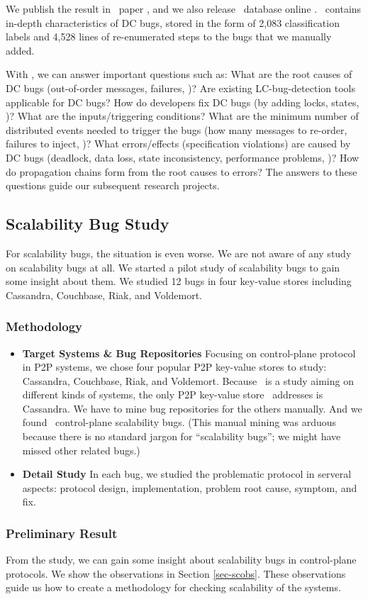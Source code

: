 We publish the result in \taxdc\ paper \cite{Leesatapornwongsa+16-TaxDC}, and we
also release \taxdc\ database online \cite{TaxDCWeb}.  \taxdc\ contains in-depth
characteristics of DC bugs, stored in the form of 2,083 classification labels
and 4,528 lines of re-enumerated steps to the bugs that we manually added. 

With \taxdc, we can answer important questions such as: What are the root causes
of DC bugs (out-of-order messages, failures, \etc)?  Are existing
LC-bug-detection tools applicable for DC bugs? How do developers fix DC bugs (by
adding locks, states, \etc)? What are the inputs/triggering conditions?  What
are the minimum number of distributed events needed to trigger the bugs (how
many messages to re-order, failures to inject, \etc)?  What errors/effects
(specification violations) are caused by DC bugs (deadlock, data loss, state
inconsistency, performance problems, \etc)? How do propagation chains form from
the root causes to errors? The answers to these questions guide our subsequent
research projects.

\subsection{Scalability Bug Study}

For scalability bugs, the situation is even worse. We are not aware of any study
on scalability bugs at all. We started a pilot study of scalability bugs to gain
some insight about them. We studied 12 bugs in four key-value stores including
Cassandra, Couchbase, Riak, and Voldemort.

\subsubsection{Methodology}

\begin{itemize}

\item {\bf Target Systems \& Bug Repositories} Focusing on control-plane
protocol in P2P systems, we chose four popular P2P key-value stores to study:
Cassandra, Couchbase, Riak, and Voldemort. Because \cbs\ is a study aiming on
different kinds of systems, the only P2P key-value store \cbs\ addresses is
Cassandra. We have to mine bug repositories for the others manually.  And we
found \numStudy\ control-plane scalability bugs.  (This manual mining was arduous
because there is no standard jargon for ``scalability bugs''; we might have
missed other related bugs.)

\item {\bf Detail Study} In each bug, we studied the problematic protocol in
serveral aspects: protocol design, implementation, problem root cause, symptom,
and fix.

\end{itemize}

\subsubsection{Preliminary Result}

From the study, we can gain some insight about scalability bugs in control-plane
protocols. We show the observations in Section \ref{sec-scobs}. These
observations guide us how to create a methodology for checking scalability of
the systems.

